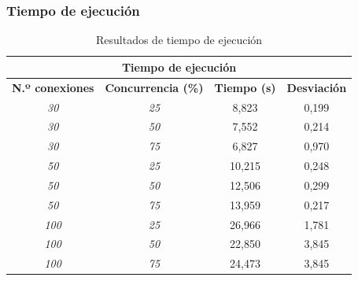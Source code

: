 \subsubsection{Tiempo de ejecución}
\begin{table}[!ht]
	\begin{center}
		\begin{tabular}{|c|c|c|c|}
			\hline
			\multicolumn{4}{|c|}{{\bf Tiempo de ejecución}}                                                           \\ \hline
			{\bf N.º conexiones} & {\bf Concurrencia (\%)} & {\bf Tiempo (s)} & {\bf Desviación} \\ \hline
			{\it 30}                   & {\it 25}                  & 8,823              & 0,199                     \\ \hline
			{\it 30}                   & {\it 50}                  & 7,552              & 0,214                     \\ \hline
			{\it 30}                   & {\it 75}                  & 6,827              & 0,970                     \\ \hline
			{\it 50}                   & {\it 25}                  & 10,215             & 0,248                     \\ \hline
			{\it 50}                   & {\it 50}                  & 12,506             & 0,299                     \\ \hline
			{\it 50}                   & {\it 75}                  & 13,959             & 0,217                     \\ \hline
			{\it 100}                  & {\it 25}                  & 26,966             & 1,781                     \\ \hline
			{\it 100}                  & {\it 50}                  & 22,850             & 3,845                     \\ \hline
			{\it 100}                  & {\it 75}                  & 24,473             & 3,845                     \\ \hline
		\end{tabular}
		\caption{Resultados de tiempo de ejecución}
		\label{table:rte}
	\end{center}
\end{table}

